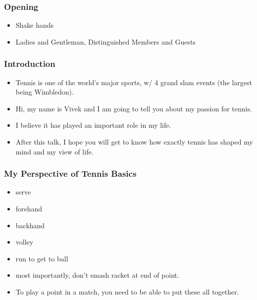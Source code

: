 \begin{frame}
\frametitle{Opening}
\begin{itemize}
\item Shake hands 
\item Ladies and Gentleman, Distinguished Members and Guests 
\end{itemize}
\end{frame} 

\begin{frame}
\frametitle{Introduction}
\begin{itemize}
\item \small Tennis is one of the world's major sports, w/ 4 grand
  slam events (the largest being Wimbledon). 
\item \small Hi, my name is Vivek and  I am going to tell you about my passion for tennis. 
\item \small I believe it has played an important role in my life. 
\item \small After this talk, I hope you will get to know how exactly tennis has shaped my mind and my view of life. 
\end{itemize} 
\end{frame} 

\begin{frame} 
\frametitle{My Perspective of Tennis Basics}
\begin{itemize} 
\item \small serve
\item \small forehand  
\item \small backhand  
\item \small volley
\item \small run to get to ball
\item \small most importantly, don't smash racket at end of point. 
\item \small To play a point in a match, you need to be able to put these all together.  \\
\end{itemize}  
\end{frame} 

